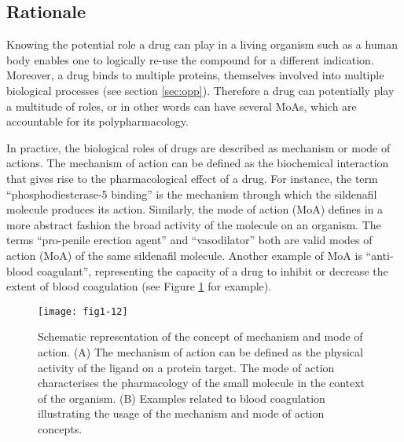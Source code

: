 \subsection{Rationale}

Knowing the potential role a drug can play in a living organism such as a human body enables one to logically re-use the compound for a different indication. Moreover, a drug binds to multiple proteins, themselves involved into multiple biological processes (see section \ref{sec:opp}). Therefore a drug can potentially play a multitude of roles, or in other words can have several MoAs, which are accountable for its polypharmacology.

In practice, the biological roles of drugs are described as mechanism or mode of actions. The mechanism of action can be defined as the biochemical interaction that gives rise to the pharmacological effect of a drug. For instance, the term “phosphodiesterase-5 binding” is the mechanism through which the sildenafil molecule produces its action. Similarly, the mode of action (MoA) defines in a more abstract fashion the broad activity of the molecule on an organism. The terms “pro-penile erection agent” and “vasodilator” both are valid modes of action (MoA) of the same sildenafil molecule. Another example of MoA is “anti-blood coagulant”, representing the capacity of a drug to inhibit or decrease the extent of blood coagulation (see Figure \ref{fig1-12} for example).

\begin{figure}[ht]
    \centering
    \texttt{[image: fig1-12]}
    \caption{Schematic representation of the concept of mechanism and mode of action. (A) The mechanism of action can be defined as the physical activity of the ligand on a protein target. The mode of action characterises the pharmacology of the small molecule in the context of the organism. (B) Examples related to blood coagulation illustrating the usage of the mechanism and mode of action concepts.}
    \label{fig1-12}
\end{figure}

